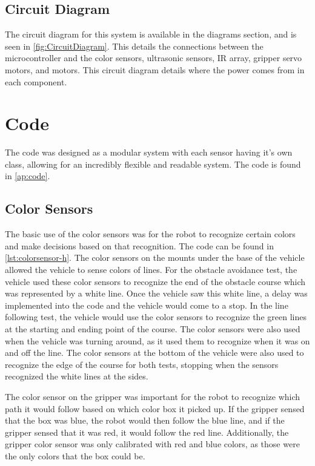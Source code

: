\documentclass[11pt]{report}
\begin{document}
\subsection{Circuit Diagram}
The circuit diagram for this system is available in the diagrams section, and is seen in \cref{fig:CircuitDiagram}. This details the connections between the microcontroller and the color sensors, ultrasonic sensors, \gls{IR} array, gripper servo motors, and motors. This circuit diagram details where the power comes from in each component.

\section{Code}
 The code was designed as a modular system with each sensor having it's own class, allowing for an incredibly flexible and readable system. The code is found in \cref{ap:code}.

\subsection{Color Sensors}
The basic use of the color sensors was for the robot to recognize certain colors and make decisions based on that recognition. The code can be found in \cref{lst:colorsensor-h}. The color sensors on the mounts under the base of the vehicle allowed the vehicle to sense colors of lines. For the obstacle avoidance test, the vehicle used these color sensors to recognize the end of the obstacle course which was represented by a white line. Once the vehicle saw this white line, a delay was implemented into the code and the vehicle would come to a stop. In the line following test, the vehicle would use the color sensors to recognize the green lines at the starting and ending point of the course. The color sensors were also used when the vehicle was turning around, as it used them to recognize when it was on and off the line. The color sensors at the bottom of the vehicle were also used to recognize the edge of the course for both tests, stopping when the sensors recognized the white lines at the sides.

\par The color sensor on the gripper was important for the robot to recognize which path it would follow based on which color box it picked up. If the gripper sensed that the box was blue, the robot would then follow the blue line, and if the gripper sensed that it was red, it would follow the red line. Additionally, the gripper color sensor was only calibrated with red and blue colors, as those were the only colors that the box could be.
\end{document}
